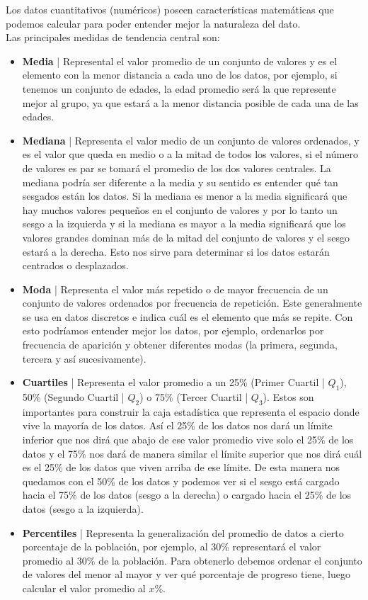 \documentclass{article}
\begin{document}
Los datos cuantitativos (numéricos) poseen características matemáticas que podemos calcular para poder entender mejor la naturaleza del dato.
\\[12pt]
Las principales medidas de tendencia central son:
\begin{itemize}
    \item \textbf{Media} | Represental el valor promedio de un conjunto de valores y es el elemento con la menor distancia a cada uno de los datos, por ejemplo, si tenemos un conjunto de edades, la edad promedio será la que represente mejor al grupo, ya que estará a la menor distancia posible de cada una de las edades.
    \item \textbf{Mediana} | Representa el valor medio de un conjunto de valores ordenados, y es el valor que queda en medio o a la mitad de todos los valores, si el número de valores es par se tomará el promedio de los dos valores centrales. La mediana podría ser diferente a la media y su sentido es entender qué tan sesgados están los datos. Si la mediana es menor a la media significará que hay muchos valores pequeños en el conjunto de valores y por lo tanto un sesgo a la izquierda y si la mediana es mayor a la media significará que los valores grandes dominan más de la mitad del conjunto de valores y el sesgo estará a la derecha. Esto nos sirve para determinar si los datos estarán centrados o desplazados.
    \item \textbf{Moda} | Representa el valor más repetido o de mayor frecuencia de un conjunto de valores ordenados por frecuencia de repetición. Este generalmente se usa en datos discretos e indica cuál es el elemento que más se repite. Con esto podríamos entender mejor los datos, por ejemplo, ordenarlos por frecuencia de aparición y obtener diferentes modas (la primera, segunda, tercera y así sucesivamente).
    \item \textbf{Cuartiles} | Representa el valor promedio a un 25\% (Primer Cuartil | $Q_1$), 50\% (Segundo Cuartil | $Q_2$) o 75\% (Tercer Cuartil | $Q_3$). Estos son importantes para construir la caja estadística que representa el espacio donde vive la mayoría de los datos. Así el 25\% de los datos nos dará un límite inferior que nos dirá que abajo de ese valor promedio vive solo el 25\% de los datos y el 75\% nos dará de manera similar el límite superior que nos dirá cuál es el 25\% de los datos que viven arriba de ese límite. De esta manera nos quedamos con el 50\% de los datos y podemos ver si el sesgo está cargado hacia el 75\% de los datos (sesgo a la derecha) o cargado hacia el 25\% de los datos (sesgo a la izquierda).
    \item \textbf{Percentiles} | Representa la generalización del promedio de datos a cierto porcentaje de la población, por ejemplo, al 30\% representará el valor promedio al 30\% de la población. Para obtenerlo debemos ordenar el conjunto de valores del menor al mayor y ver qué porcentaje de progreso tiene, luego calcular el valor promedio al $x\%$.
\end{itemize}
\end{document}
